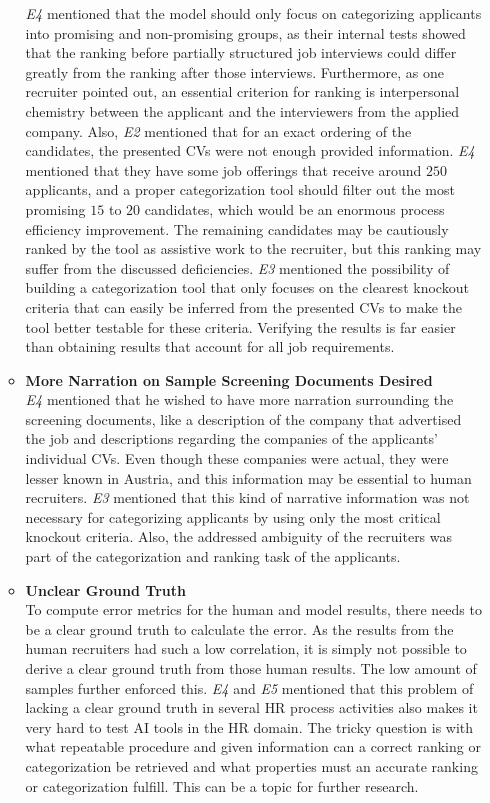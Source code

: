 \documentclass[draft,final]{thesisclass} %
\begin{document}
\begin{enumerate}
\begin{itemize}
        \textit{E4} mentioned that the model should only focus on categorizing applicants into promising and non-promising groups, as their internal tests showed that the ranking before partially structured job interviews could differ greatly from the ranking after those interviews. Furthermore, as one recruiter pointed out, an essential criterion for ranking is interpersonal chemistry between the applicant and the interviewers from the applied company. Also, \textit{E2} mentioned that for an exact ordering of the candidates, the presented \acs{CV}s were not enough provided information. \textit{E4} mentioned that they have some job offerings that receive around $250$ applicants, and a proper categorization tool should filter out the most promising $15$ to $20$ candidates, which would be an enormous process efficiency improvement. The remaining candidates may be cautiously ranked by the tool as assistive work to the recruiter, but this ranking may suffer from the discussed deficiencies. \textit{E3} mentioned the possibility of building a categorization tool that only focuses on the clearest knockout criteria that can easily be inferred from the presented \acs{CV}s to make the tool better testable for these criteria. Verifying the results is far easier than obtaining results that account for all job requirements.
        \item \textbf{More Narration on Sample Screening Documents Desired}\\
        \textit{E4} mentioned that he wished to have more narration surrounding the screening documents, like a description of the company that advertised the job and descriptions regarding the companies of the applicants' individual \acs{CV}s. Even though these companies were actual, they were lesser known in Austria, and this information may be essential to human recruiters. \textit{E3} mentioned that this kind of narrative information was not necessary for categorizing applicants by using only the most critical knockout criteria. Also, the addressed ambiguity of the recruiters was part of the categorization and ranking task of the applicants.
        \item \textbf{Unclear Ground Truth}\\
        To compute error metrics for the human and model results, there needs to be a clear ground truth to calculate the error. As the results from the human recruiters had such a low correlation, it is simply not possible to derive a clear ground truth from those human results. The low amount of samples further enforced this. \textit{E4} and \textit{E5} mentioned that this problem of lacking a clear ground truth in several \acs{HR} process activities also makes it very hard to test \acs{AI} tools in the \acs{HR} domain. The tricky question is with what repeatable procedure and given information can a correct ranking or categorization be retrieved and what properties must an accurate ranking or categorization fulfill. This can be a topic for further research.

\end{itemize}
\end{enumerate}
\end{document}

